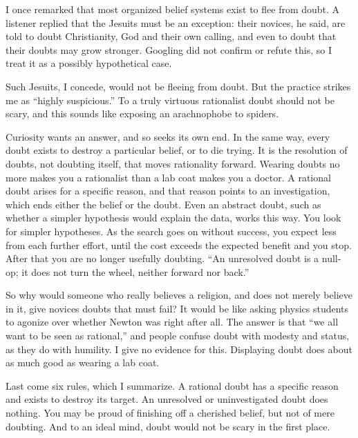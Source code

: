
I once remarked that most organized belief systems exist to flee from doubt. A listener replied that the Jesuits must be an exception: their novices, he said, are told to doubt Christianity, God and their own calling, and even to doubt that their doubts may grow stronger. Googling did not confirm or refute this, so I treat it as a possibly hypothetical case.

Such Jesuits, I concede, would not be fleeing from doubt. But the practice strikes me as ``highly suspicious.'' To a truly virtuous rationalist doubt should not be scary, and this sounds like exposing an arachnophobe to spiders. 

Curiosity wants an answer, and so seeks its own end. In the same way, every doubt exists to destroy a particular belief, or to die trying. It is the resolution of doubts, not doubting itself, that moves rationality forward. Wearing doubts no more makes you a rationalist than a lab coat makes you a doctor. A rational doubt arises for a specific reason, and that reason points to an investigation, which ends either the belief or the doubt. Even an abstract doubt, such as whether a simpler hypothesis would explain the data, works this way. You look for simpler hypotheses. As the search goes on without success, you expect less from each further effort, until the cost exceeds the expected benefit and you stop. After that you are no longer usefully doubting.  ``An unresolved doubt is a null-op; it does not turn the wheel, neither forward nor back.'' 

So why would someone who really believes a religion, and does not merely believe in it, give novices doubts that must fail? It would be like asking physics students to agonize over whether Newton was right after all. The answer is that ``we all want to be seen as rational,'' and people confuse doubt with modesty and status, as they do with humility. I give no evidence for this. Displaying doubt does about as much good as wearing a lab coat.

Last come six rules, which I summarize. A rational doubt has a specific reason and exists to destroy its target. An unresolved or uninvestigated doubt does nothing. You may be proud of finishing off a cherished belief, but not of mere doubting. And to an ideal mind, doubt would not be scary in the first place.
